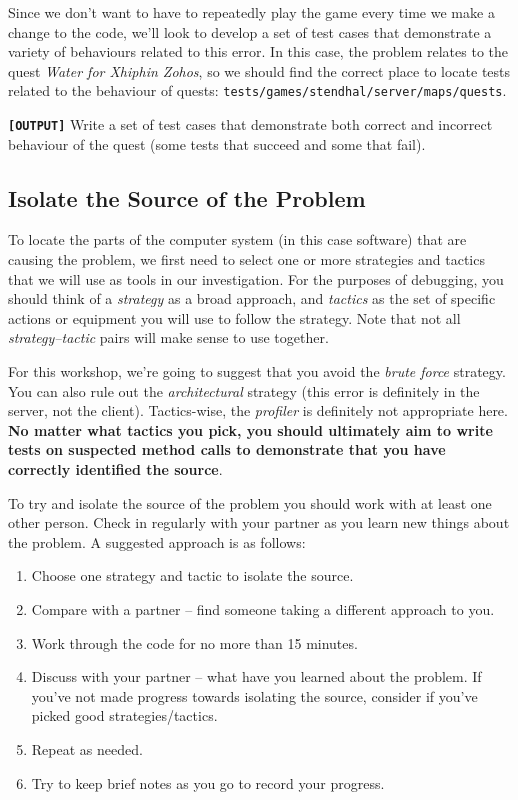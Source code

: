 \documentclass[
]{book}
\providecommand{\tightlist}{%
  \setlength{\itemsep}{0pt}\setlength{\parskip}{0pt}}
\begin{document}
Since we don't want to have to repeatedly play the game every time we make a change to the code, we'll look to develop a set of test cases that demonstrate a variety of behaviours related to this error. In this case, the problem relates to the quest \emph{Water for Xhiphin Zohos}, so we should find the correct place to locate tests related to the behaviour of quests: \texttt{tests/games/stendhal/server/maps/quests}.

\textbf{\texttt{{[}OUTPUT{]}}} Write a set of test cases that demonstrate both correct and incorrect behaviour of the quest (some tests that succeed and some that fail).

\hypertarget{isolation}{%
\subsection{Isolate the Source of the Problem}\label{isolation}}

To locate the parts of the computer system (in this case software) that are causing the problem, we first need to select one or more strategies and tactics that we will use as tools in our investigation. For the purposes of debugging, you should think of a \emph{strategy} as a broad approach, and \emph{tactics} as the set of specific actions or equipment you will use to follow the strategy. Note that not all \emph{strategy--tactic} pairs will make sense to use together.

For this workshop, we're going to suggest that you avoid the \emph{brute force} strategy. You can also rule out the \emph{architectural} strategy (this error is definitely in the server, not the client). Tactics-wise, the \emph{profiler} is definitely not appropriate here. \textbf{No matter what tactics you pick, you should ultimately aim to write tests on suspected method calls to demonstrate that you have correctly identified the source}.

To try and isolate the source of the problem you should work with at least one other person. Check in regularly with your partner as you learn new things about the problem. A suggested approach is as follows:

\begin{enumerate}
\def\labelenumi{\arabic{enumi}.}
\tightlist
\item
  Choose one strategy and tactic to isolate the source.
\item
  Compare with a partner -- find someone taking a different approach to you.
\item
  Work through the code for no more than 15 minutes.
\item
  Discuss with your partner -- what have you learned about the problem. If you've not made progress towards isolating the source, consider if you've picked good strategies/tactics.
\item
  Repeat as needed.
\item
  Try to keep brief notes as you go to record your progress.
\end{enumerate}
\end{document}
